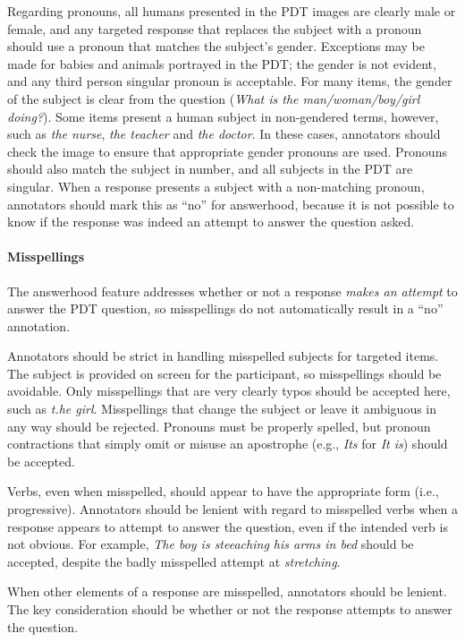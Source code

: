 \documentclass[12pt,notitlepage]{article}
\begin{document}
Regarding pronouns, all humans presented in the PDT images are clearly male or female, and any targeted response that replaces the subject with a pronoun should use a pronoun that matches the subject's gender. Exceptions may be made for babies and animals portrayed in the PDT; the gender is not evident, and any third person singular pronoun is acceptable. For many items, the gender of the subject is clear from the question (\textit{What is the man/woman/boy/girl doing?}). Some items present a human subject in non-gendered terms, however, such as \textit{the nurse}, \textit{the teacher} and \textit{the doctor}. In these cases, annotators should check the image to ensure that appropriate gender pronouns are used. Pronouns should also match the subject in number, and all subjects in the PDT are singular. When a response presents a subject with a non-matching pronoun, annotators should mark this as ``no'' for answerhood, because it is not possible to know if the response was indeed an attempt to answer the question asked. 

\paragraph{Misspellings}
\label{para:answerhood-misspellings}
The answerhood feature addresses whether or not a response \textit{makes an attempt} to answer the PDT question, so misspellings do not automatically result in a ``no'' annotation. 

Annotators should be strict in handling misspelled subjects for targeted items. The subject is provided on screen for the participant, so misspellings should be avoidable. Only misspellings that are very clearly typos should be accepted here, such as \textit{t.he girl}. Misspellings that change the subject or leave it ambiguous in any way should be rejected. Pronouns must be properly spelled, but pronoun contractions that simply omit or misuse an apostrophe (e.g., \textit{Its} for \textit{It is}) should be accepted.

Verbs, even when misspelled, should appear to have the appropriate form (i.e., progressive). Annotators should be lenient with regard to misspelled verbs when a response appears to attempt to answer the question, even if the intended verb is not obvious. For example, \textit{The boy is steeaching his arms in bed} should be accepted, despite the badly misspelled attempt at \textit{stretching}.

When other elements of a response are misspelled, annotators should be lenient. The key consideration should be whether or not the response attempts to answer the question.
\end{document}
